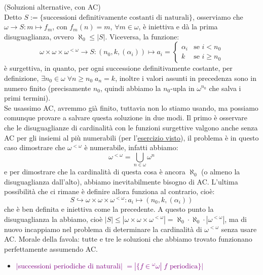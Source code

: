 \begin{soln}
	(Soluzioni alternative, con AC)\\
	Detto $S := \{\text{successioni definitivamente costanti di naturali}\}$, osserviamo che $\omega \to S : m \mapsto f_m$, con $f_m(n) = m$, $\forall m \in \omega$, \`e iniettiva e d\`a la prima disuguaglianza, ovvero $\aleph_0 \leq |S|$.
	Viceversa, la funzione:
	\[ \omega \times \omega \times \omega^{<\omega} \to S : (n_0,k,(\alpha_i)) \mapsto a_i = \begin{cases}
		\alpha_i &\text{se $i < n_0$} \\
		k &\text{se $i \geq n_0$}
	\end{cases}
		\]
	\`e surgettiva, in quanto, per ogni successione definitivamente costante, per definizione, $\exists n_0 \in \omega \; \forall n \geq n_0 \; a_n = k$, inoltre i valori assunti in precedenza sono in numero finito (precisamente $n_0$, quindi abbiamo la $n_0$-upla in $\omega^{n_0}$ che salva i primi termini).\\
	Se usassimo AC, avremmo gi\`a finito, tuttavia non lo stiamo usando, ma possiamo comunque provare a salvare questa soluzione in due modi.
	Il primo \`e osservare che le disuguaglianze di cardinalit\`a con le funzioni surgettive valgono anche senza AC per gli insiemi al pi\`u numerabili (per l'\hyperref[disuguaglianze_senza_AC2]{esercizio visto}), il problema \`e in questo caso dimostrare che $\omega^{<\omega}$ \`e numerabile, infatti abbiamo:
	\[ \omega^{<\omega} = \bigcup_{n \in \omega} \omega^n
		\]
	e per dimostrare che la cardinalit\`a di questa cosa \`e ancora $\aleph_0$ (o almeno la disuguaglianza dall'alto), abbiamo inevitabilmente bisogno di AC. L'ultima possibilit\`a che ci rimane \`e definire allora funziona al contrario, cio\`e:
	\[ S \hookrightarrow \omega \times \omega \times \omega^{<\omega} : a_i \mapsto (n_0,k,(\alpha_i))
		\]
	che \`e ben definita e iniettiva come la precedente. A questo punto la disuguaglianza la abbiamo, cio\`e $|S| \leq |\omega \times \omega \times \omega^{<\omega}| = \aleph_0 \cdot \aleph_0 \cdot |\omega^{<\omega}|$, ma di nuovo incappiamo nel problema di determinare la cardinalit\`a di $\omega^{<\omega}$ senza usare AC. Morale della favola:
	tutte e tre le soluzioni che abbiamo trovato funzionano perfettamente assumendo AC.
\end{soln}

\begin{itemize}
	\item \textcolor{purple}{$|$successioni periodiche di naturali$|$ $= |\{f \in {}^\omega \omega | \;\text{$f$ periodica}\}|$}
\end{itemize}

